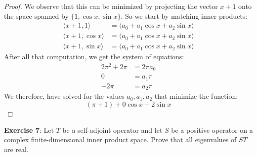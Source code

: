 \documentclass{article}
\begin{document}
\begin{proof}
	We observe that this can be minimized by projecting the vector $x + 1$ onto the space spanned by $\{1, \cos{x}, \sin{x}\}$. So we start by matching inner products:
	\begin{align*}
		\langle x + 1, 1 \rangle &= \langle a_{0} + a_{1}\cos{x} + a_{2}\sin{x} \rangle \\
		\langle x + 1, \cos{x} \rangle &= \langle a_{0} + a_{1}\cos{x} + a_{2}\sin{x} \rangle \\
		\langle x + 1, \sin{x} \rangle &= \langle a_{0} + a_{1}\cos{x} + a_{2}\sin{x} \rangle
	\end{align*}
	After all that computation, we get the system of equations:
	\begin{align*}
		2\pi^{2} + 2\pi &= 2\pi a_{0} \\
		0 &= a_{1}\pi \\
		-2\pi &= a_{2}\pi 
	\end{align*}
	We therefore, have solved for the values $a_{0}, a_{1}, a_{2}$ that minimize the function:
	\begin{equation*}
		( \pi + 1 ) + 0\cos{x} - 2\sin{x}
	\end{equation*}
\end{proof}
\textbf{Exercise 7}: Let $T$ be a self-adjoint operator and let $S$ be a positive operator on a complex finite-dimensional inner product space. Prove that all eigenvalues of $ST$ are real.
\end{document}
